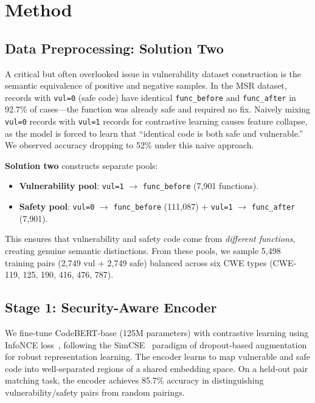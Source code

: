 \documentclass[10pt,conference]{IEEEtran}
\begin{document}
\section{Method}

\subsection{Data Preprocessing: Solution Two}

A critical but often overlooked issue in vulnerability dataset construction is the semantic equivalence of positive and negative samples. In the MSR dataset, records with \texttt{vul=0} (safe code) have identical \texttt{func\_before} and \texttt{func\_after} in 92.7\% of cases---the function was already safe and required no fix. Naively mixing \texttt{vul=0} records with \texttt{vul=1} records for contrastive learning causes feature collapse, as the model is forced to learn that ``identical code is both safe and vulnerable.'' We observed accuracy dropping to 52\% under this naive approach.

\textbf{Solution two} constructs separate pools:
\begin{itemize}
\item \textbf{Vulnerability pool}: \texttt{vul=1} $\rightarrow$ \texttt{func\_before} (7,901 functions).
\item \textbf{Safety pool}: \texttt{vul=0} $\rightarrow$ \texttt{func\_before} (111,087) + \texttt{vul=1} $\rightarrow$ \texttt{func\_after} (7,901).
\end{itemize}
This ensures that vulnerability and safety code come from \textit{different functions}, creating genuine semantic distinctions. From these pools, we sample 5,498 training pairs (2,749 vul + 2,749 safe) balanced across six CWE types (CWE-119, 125, 190, 416, 476, 787).

\subsection{Stage 1: Security-Aware Encoder}

We fine-tune CodeBERT-base (125M parameters) with contrastive learning using InfoNCE loss~\cite{infonce}, following the SimCSE~\cite{simcse} paradigm of dropout-based augmentation for robust representation learning. The encoder learns to map vulnerable and safe code into well-separated regions of a shared embedding space. On a held-out pair matching task, the encoder achieves 85.7\% accuracy in distinguishing vulnerability/safety pairs from random pairings.
\end{document}
